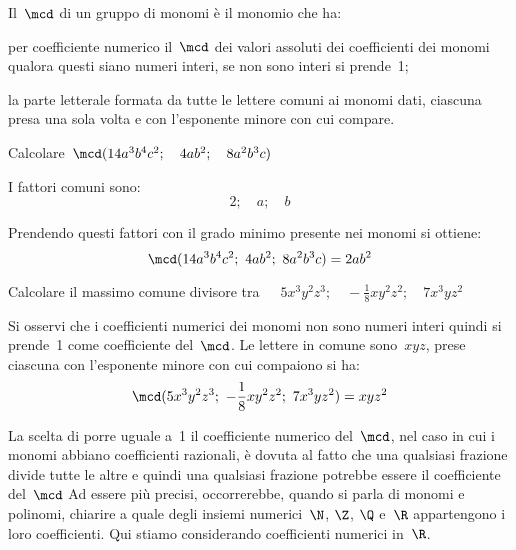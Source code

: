 \begin{procedura}

Il~\(\mcd\) di un gruppo di monomi è il monomio che ha:

\begin{enumeratea}
 \item per coefficiente numerico il~\(\mcd\) dei valori assoluti dei
coefficienti dei monomi qualora
questi siano numeri interi, se non sono interi si prende~1;
 \item la parte letterale formata da tutte le lettere comuni ai monomi
dati, ciascuna presa una sola volta e con l'esponente minore con cui 
compare.
\end{enumeratea}
\end{procedura}

\begin{exrig}
 \begin{esempio}
Calcolare~\(\mcd (14a^{3}b^{4}c^{2}; \quad 4ab^{2}; \quad 8a^{2}b^{3}c)\) 

I fattori comuni sono:
\[2; \quad a; \quad b\]

Prendendo questi fattori con il grado minimo presente nei monomi 
si ottiene:
\[\mcd(14a^{3}b^{4}c^{2};~4ab^{2};~8a^{2}b^{3}c)=2ab^{2}\]
 \end{esempio}

 \begin{esempio}
Calcolare il massimo comune divisore 
tra~\(\quad 5x^{3}y^{2}z^{3}; \quad -\frac{1}{8}xy^{2}z^{2}; 
     \quad 7x^{3}yz^{2}\)

Si osservi che i coefficienti numerici dei monomi non sono numeri interi
quindi si prende~1 come coefficiente del~\(\mcd\).
Le lettere in comune sono~\(xyz\), prese ciascuna con
l'esponente minore con cui compaiono si ha:
\[\mcd(5x^{3}y^{2}z^{3};~-\frac{1}{8}xy^{2}z^{2};~7x^{3}yz^{2})=xyz^{2}\]
 \end{esempio}
\end{exrig}

\osservazione La scelta di porre uguale a~1 il coefficiente numerico 
del~\(\mcd\), nel
caso in cui i monomi abbiano coefficienti razionali, è dovuta al
fatto che una qualsiasi frazione divide tutte le altre e quindi una
qualsiasi frazione potrebbe essere il coefficiente del~\(\mcd\) Ad essere
più precisi, occorrerebbe, quando si parla di monomi e polinomi,
chiarire a quale degli insiemi numerici~\(\N\), \(\Z\), \(\Q\) e~\(\R\) 
appartengono i loro coefficienti. Qui stiamo considerando coefficienti 
numerici in~\(\R\).

